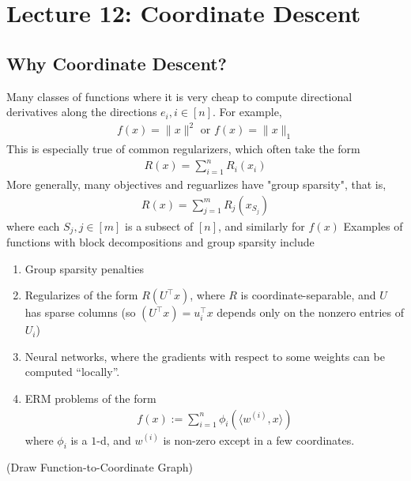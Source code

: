 \section{Lecture 12: Coordinate Descent}
\subsection{Why Coordinate Descent?}
Many classes of functions where it is very cheap 
to compute directional derivatives along the directions $e_i, i \in [n]$.
%
For example, 
%
\begin{eqnarray}
f(x) = \|x\|^2 \text{ or } f(x) = \|x\|_1
\end{eqnarray}
%
This is especially true of common regularizers, 
%
which often take the form 
\begin{eqnarray}
R(x) = \sum_{i=1}^n R_i(x_i)
\end{eqnarray}
%
More generally, many objectives and reguarlizes have "group sparsity", that is,
%
\begin{eqnarray}
R(x) = \sum_{j=1}^m R_{j}(x_{S_j})
\end{eqnarray}
where each $S_j, j \in [m]$ is a subsect of $[n]$, and similarly for $f(x)$
%
Examples of functions with block decompositions and group sparsity include
\begin{enumerate} 
	\item Group sparsity penalties  
	\item Regularizes of the form $R(U^\top x)$, where $R$ is coordinate-separable, and $U$ has sparse columns (so $(U^\top x) = u_i^\top x$ depends only on the nonzero entries of $U_i$)
	\item Neural networks, where the gradients with respect to some weights can be computed ``locally''.
	\item ERM problems of the form 
	\begin{eqnarray}
	f(x) := \sum_{i=1}^n \phi_i(\langle w^{(i)} , x \rangle )
	\end{eqnarray}
	where $\phi_i$ is a $1$-d, and $w^{(i)}$ is non-zero except in a few coordinates. 
\end{enumerate} 
(Draw Function-to-Coordinate Graph)
